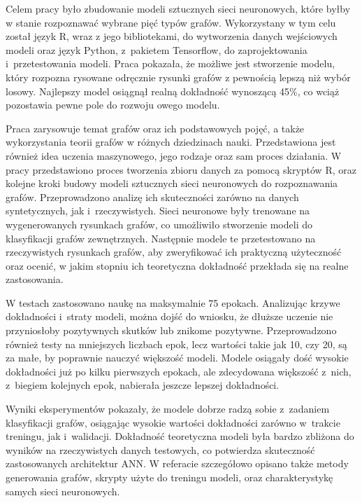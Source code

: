 Celem pracy było zbudowanie modeli sztucznych sieci neuronowych,
które byłby w stanie rozpoznawać wybrane pięć typów grafów.
Wykorzystany w tym celu został język R, wraz z jego bibliotekami, do wytworzenia danych wejściowych modeli
oraz język Python, z~pakietem Tensorflow, do zaprojektowania i~przetestowania modeli.
Praca pokazała, że możliwe jest stworzenie modelu, który rozpozna rysowane odręcznie rysunki grafów
z pewnością lepszą niż wybór losowy.
Najlepszy model osiągnął realną dokładność wynoszącą 45\%,
co wciąż pozostawia pewne pole do rozwoju owego modelu.

Praca zarysowuje temat grafów oraz ich podstawowych pojęć,
a także wykorzystania teorii grafów w różnych dziedzinach nauki.
Przedstawiona jest również idea uczenia maszynowego,
jego rodzaje oraz sam proces działania.
W pracy przedstawiono proces tworzenia zbioru danych za pomocą skryptów R,
oraz kolejne kroki budowy modeli sztucznych sieci neuronowych do rozpoznawania grafów.
Przeprowadzono analizę ich skuteczności zarówno na danych syntetycznych, jak i~rzeczywistych.
Sieci neuronowe były trenowane na wygenerowanych rysunkach grafów,
co umożliwiło stworzenie modeli do klasyfikacji grafów zewnętrznych.
Następnie modele te przetestowano na rzeczywistych rysunkach grafów,
aby zweryfikować ich praktyczną użyteczność oraz ocenić,
w jakim stopniu ich teoretyczna dokładność przekłada się na realne zastosowania.

W testach zastosowano naukę na maksymalnie 75 epokach.
Analizując krzywe dokładności i~straty modeli, można dojść do wniosku,
że dłuższe uczenie nie przyniosłoby pozytywnych skutków lub znikome pozytywne.
Przeprowadzono również testy na mniejszych liczbach epok, lecz wartości takie jak 10, czy 20,
są za małe, by poprawnie nauczyć większość modeli.
Modele osiągały dość wysokie dokładności już po kilku pierwszych epokach,
ale zdecydowana większość z~nich, z~biegiem kolejnych epok, nabierała jeszcze lepszej dokładności.


Wyniki eksperymentów pokazały, że modele dobrze radzą sobie z~zadaniem klasyfikacji grafów,
osiągając wysokie wartości dokładności zarówno w~trakcie treningu, jak i~walidacji.
Dokładność teoretyczna modeli była bardzo zbliżona do wyników na rzeczywistych danych testowych,
co potwierdza skuteczność zastosowanych architektur ANN.
W referacie szczegółowo opisano także metody generowania grafów,
skrypty użyte do treningu modeli, oraz charakterystykę samych sieci neuronowych.

